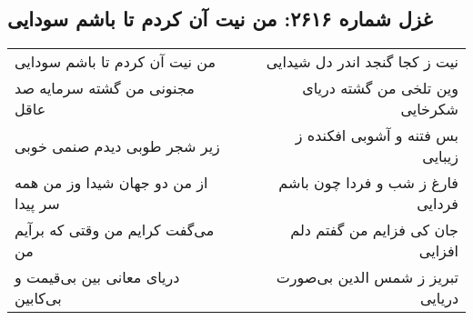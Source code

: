 \begin{center}
\section*{غزل شماره ۲۶۱۶: من نیت آن کردم تا باشم سودایی}
\label{sec:2616}
\begin{longtable}{l p{0.5cm} r}
من نیت آن کردم تا باشم سودایی
&&
نیت ز کجا گنجد اندر دل شیدایی
\\
مجنونی من گشته سرمایه صد عاقل
&&
وین تلخی من گشته دریای شکرخایی
\\
زیر شجر طوبی دیدم صنمی خوبی
&&
بس فتنه و آشوبی افکنده ز زیبایی
\\
از من دو جهان شیدا وز من همه سر پیدا
&&
فارغ ز شب و فردا چون باشم فردایی
\\
می‌گفت کرایم من وقتی که برآیم من
&&
جان کی فزایم من گفتم دلم افزایی
\\
دریای معانی بین بی‌قیمت و بی‌کابین
&&
تبریز ز شمس الدین بی‌صورت دریایی
\\
\end{longtable}
\end{center}

